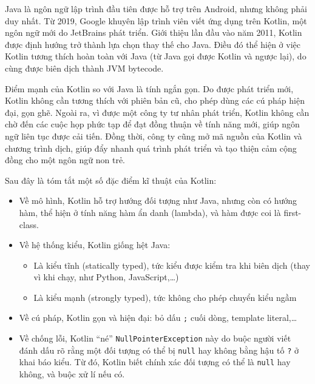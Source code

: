\documentclass[../../thesis]{subfiles}
\begin{document}
Java là ngôn ngữ lập trình đầu tiên được hỗ trợ trên Android, nhưng không phải
duy nhất. Từ 2019, Google khuyên lập trình viên viết ứng dụng trên Kotlin, một
ngôn ngữ mới do JetBrains phát triển. Giới thiệu lần đầu vào năm 2011, Kotlin
được định hướng trở thành lựa chọn thay thế cho Java. Điều đó thể hiện ở việc
Kotlin tương thích hoàn toàn với Java (từ Java gọi được Kotlin và ngược lại), do
cùng được biên dịch thành JVM bytecode.

Điểm mạnh của Kotlin so với Java là tính ngắn gọn. Do được phát triển mới,
Kotlin không cần tương thích với phiên bản cũ, cho phép dùng các cú pháp hiện
đại, gọn ghẽ. Ngoài ra, vì được một công ty tư nhân phát triển, Kotlin không cần
chờ đến các cuộc họp phức tạp để đạt đồng thuận về tính năng mới, giúp ngôn ngữ
liên tục được cải tiến. Đồng thời, công ty cũng mở mã nguồn của Kotlin và chương
trình dịch, giúp đẩy nhanh quá trình phát triển và tạo thiện cảm cộng đồng cho
một ngôn ngữ non trẻ.

Sau đây là tóm tắt một số đặc điểm kĩ thuật của Kotlin:

\begin{itemize}
    \item
        Về mô hình, Kotlin hỗ trợ hướng đối tượng như Java, nhưng còn có hướng
        hàm, thể hiện ở tính năng hàm ẩn danh (lambda), và hàm được coi là
        first-class.
    \item
        Về hệ thống kiểu, Kotlin giống hệt Java:

        \begin{itemize}
            \item
                Là kiểu tĩnh (statically typed), tức kiểu được kiểm tra khi biên
                dịch (thay vì khi chạy, như Python, JavaScript,\ldots)
            \item
                Là kiểu mạnh (strongly typed), tức không cho phép chuyển kiểu
                ngầm
        \end{itemize}
    \item
        Về cú pháp, Kotlin gọn và hiện đại: bỏ dấu \texttt{;} cuối dòng,
        template literal,\ldots
    \item
        Về chống lỗi, Kotlin ``né'' \texttt{NullPointerException} này do buộc
        người viết đánh dấu rõ rằng một đối tượng có thể bị \texttt{null} hay
        không bằng hậu tố \texttt{?} ở khai báo kiểu. Từ đó, Kotlin biết chính
        xác đối tượng có thể là \texttt{null} hay không, và buộc xử lí nếu có.
\end{itemize}
\end{document}
